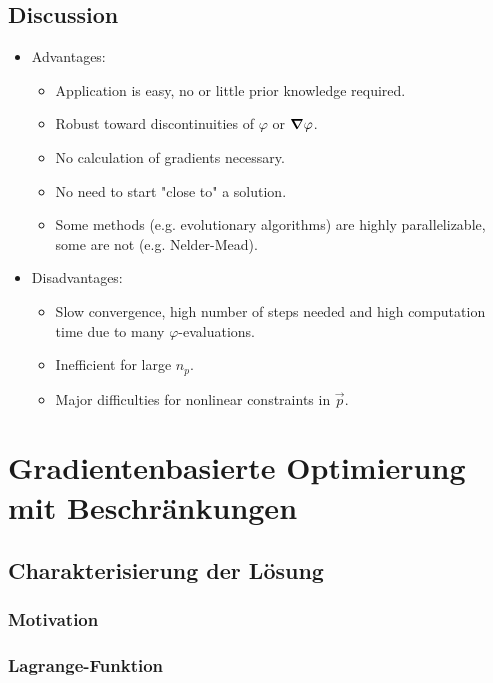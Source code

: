 	\section{Discussion}
		\begin{itemize}
			\item Advantages:
				\begin{itemize}
					\item Application is easy, no or little prior knowledge required.
					\item Robust toward discontinuities of \(\varphi\) or \(\grad{\varphi}\).
					\item No calculation of gradients necessary.
					\item No need to start "close to" a solution.
					\item Some methods (e.g. evolutionary algorithms) are highly parallelizable, some are not (e.g. Nelder-Mead).
				\end{itemize}
			\item Disadvantages:
				\begin{itemize}
					\item Slow convergence, high number of steps needed and high computation time due to many \(\varphi\)-evaluations.
					\item Inefficient for large \( n_p \).
					\item Major difficulties for nonlinear constraints in \(\vec{p}\).
				\end{itemize}
		\end{itemize}

\chapter{Gradientenbasierte Optimierung mit Beschränkungen} %

	\section{Charakterisierung der Lösung} %

		\subsection{Motivation} %

		\subsection{Lagrange-Funktion} %

